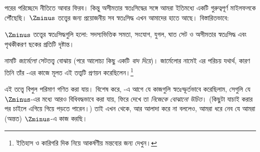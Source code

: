 \documentclass[../../../include/open-logic-section]{subfiles}
\begin{document}

পরের পরিচ্ছেদে \stagesinf{} নীতিতে আবার ফিরব। কিন্তু
অসীমতার স্বতঃসিদ্ধের সঙ্গে আমরা ইতিমধ্যে একটি গুরুত্বপূর্ণ
মাইলফলকে পৌঁছেছি। $\Zminus$ তত্ত্বের জন্য প্রয়োজনীয় সব
স্বতঃসিদ্ধ এখন আমাদের হাতে আছে। বিস্তারিতভাবে:

\begin{defn}
$\Zminus$ তত্ত্বের স্বতঃসিদ্ধগুলি হলো: সদস্যভিত্তিক সমতা,
সংযোগ, যুগল, ঘাত সেট ও অসীমতার স্বতঃসিদ্ধ এবং
পৃথকীকরণ ছকের প্রতিটি দৃষ্টান্ত।
\end{defn}

নামটি \emph{জার্মেলো} সেটতত্ত্ব বোঝায় (পরে আলোচ্য
কিছু একটি \emph{বাদ দিয়ে})। জার্মেলোর নামেই এর পরিচয়
যথার্থ, কারণ তিনি তাঁর \citeyear{Zermelo1908Untersuchungen}-এর
কাজে মূলত এই তত্ত্বটি প্রণয়ন করেছিলেন।\footnote{ইতিহাস
ও কারিগরি দিক নিয়ে আকর্ষণীয় মন্তব্যের জন্য
\citet[Appendix
A]{Potter2004} দেখুন।}

এই তত্ত্বে বিপুল পরিমাণ গণিত করা যায়। বিশেষ করে,
-এ আগে যে কাজগুলি স্বতঃস্ফূর্তভাবে
করেছিলাম, সেগুলি যে $\Zminus$-এর মধ্যে আরও বিধিবদ্ধভাবে
করা যায়, ফিরে দেখে তা \emph{নিজেকে বোঝানো উচিত}।
(কিছুটা যাচাই করার পর চাইলে এগিয়ে গিয়ে
 পড়তে পারেন।)
তাই এখন থেকে, আর আলাদা করে না বললেও, আমরা ধরে নেব
যে আমরা (অন্তত) $\Zminus$-এ কাজ করছি।
\end{document}
